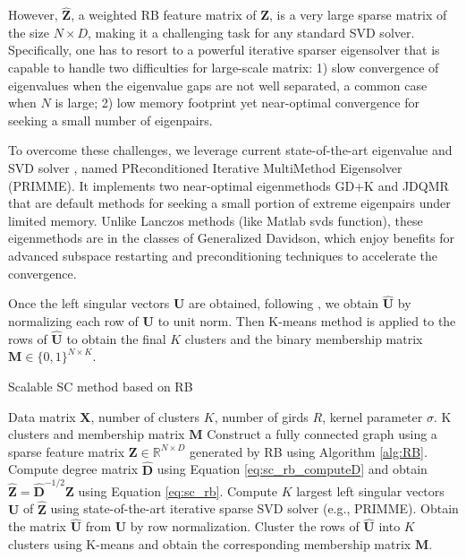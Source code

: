 \documentclass[sigconf]{acmart}
\newcommand{\R}{\mathbb{R}}
\newcommand{\1}{\boldsymbol{1}}
\newcommand{\bX}{\mathbf{X}}
\newcommand{\bD}{\mathbf{D}}
\newcommand{\bZ}{\mathbf{Z}}
\newcommand{\bU}{\mathbf{U}}
\newcommand{\bM}{\mathbf{M}}
\newcommand{\0}{\boldsymbol{0}}
\begin{document}
However, $\widehat{\bZ}$, a weighted RB feature matrix of $\bZ$, is a very large sparse matrix of the size $N \times D$, making it a challenging task for any standard SVD solver. Specifically, one has to resort to a powerful iterative sparser eigensolver that is capable to handle two difficulties for large-scale matrix: 1) slow convergence of eigenvalues when the eigenvalue gaps are not well separated, a common case when $N$ is large; 2) low memory footprint yet near-optimal convergence for seeking a small number of eigenpairs. 

To overcome these challenges, we leverage current state-of-the-art eigenvalue and SVD solver \cite{stathopoulos2010primme,wu2017primme_svds}, named PReconditioned Iterative MultiMethod Eigensolver (PRIMME). It implements two near-optimal eigenmethods GD+K and JDQMR that are default methods for seeking a small portion of extreme eigenpairs under limited memory. Unlike Lanczos methods (like Matlab svds function), these eigenmethods are in the classes of Generalized Davidson, which enjoy benefits for advanced subspace restarting and preconditioning techniques to accelerate the convergence.   

Once the left singular vectors $\bU$ are obtained, following  \cite{ng2002spectral}, we obtain $\widehat{\bU}$ by normalizing each row of $\bU$ to unit norm. Then K-means method is applied to the rows of $\widehat{\bU}$ to obtain the final $K$ clusters and the binary membership matrix $\bM \in \{0,1\}^{N \times K} $. 

\begin{algorithm}[t]
    \caption{ Scalable SC method based on RB}
    \label{alg:sc_rb}
    \begin{algorithmic}[1]
      Data matrix $\bX$,  number of clusters $K$, number of girds $R$, kernel parameter $\sigma$.
     K clusters and membership matrix $\bM$
    \STATE Construct a fully connected graph using a sparse feature matrix $\bZ \in \R^{N \times D}$ generated by RB using Algorithm \ref{alg:RB}.
    \STATE Compute degree matrix $\widehat{\bD}$ using Equation \ref{eq:sc_rb_computeD} and obtain $\widehat{\bZ} = \widehat{\bD}^{-1/2}\bZ$ using Equation \ref{eq:sc_rb}.
    \STATE Compute $K$ largest left singular vectors $\bU$ of $\widehat{\bZ}$ using state-of-the-art iterative sparse SVD solver  (e.g., PRIMME).
    \STATE Obtain the matrix $\widehat{\bU}$ from $\bU$ by row normalization.
    \STATE Cluster the rows of $\widehat{\bU}$ into $K$ clusters using K-means and obtain the corresponding membership matrix $\bM$.
    \end{algorithmic}
\end{algorithm}
\end{document}
